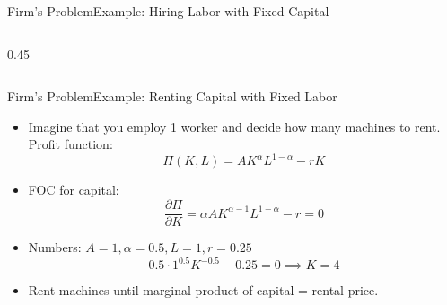 \documentclass[10pt,aspectratio=169]{beamer}
\begin{document}
\begin{frame}{Firm's Problem}{Example: Hiring Labor with Fixed Capital}
\begin{columns}[T]
\begin{column}{0.45\textwidth}
\begin{center}
\end{center}

\end{column}

\end{columns}

\end{frame}



\begin{frame}{Firm's Problem}{Example: Renting Capital with Fixed Labor}

\begin{itemize}
    \item Imagine that you employ 1 worker and decide how many machines to rent.
    \itemvso Profit function:
    \[
        \Pi(K,L) = A K^\alpha L^{1-\alpha} - r K
    \]
    \vspace{-0.3cm}
    \item FOC for capital:
    \[
        \frac{\partial \Pi}{\partial K} = \alpha A K^{\alpha-1} L^{1-\alpha} - r = 0
    \]
    \vspace{-0.3cm}
    \item Numbers: \(A=1, \alpha=0.5, L=1, r=0.25\)
    \[
        0.5 \cdot 1^{0.5} K^{-0.5} - 0.25 = 0 \implies K = 4
    \]
    \vspace{-0.3cm}
    \item Rent machines until marginal product of capital = rental price.
\end{itemize}

\end{frame}
\end{document}

